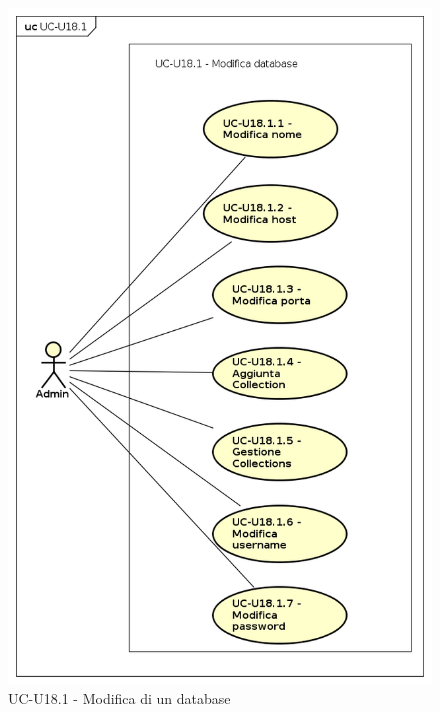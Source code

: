    \begin{figure}[H]
      \begin{center}
        \includegraphics[width=12cm]{res/img/UCUtenti/UCUtenteA/UC-U18-OperazioniDatabase/UC-U18.1-ModificaDatabase.png}
      \caption{UC-U18.1 - Modifica di un database}
      \end{center} 
    \end{figure}    
    
